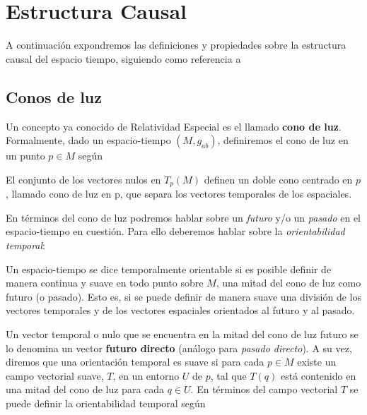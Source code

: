 ﻿\chapter{Estructura Causal}\label{estructura causal}


A continuación expondremos las definiciones y propiedades sobre la estructura causal del espacio tiempo, siguiendo como referencia a \citep{1984ucp..book.....W,1975lsss.book.....H,Penrose}






\section{Conos de luz}

Un concepto ya conocido de Relatividad Especial es el llamado \textbf{cono de luz}. Formalmente, dado un espacio-tiempo $(M,g_{ab})$, definiremos el cono de luz en un punto $p\in M$ según

\begin{definition}
El conjunto de los vectores nulos en $T_p(M)$ definen un doble cono centrado en $p$, llamado cono de luz en p, que separa los vectores temporales de los espaciales.
\end{definition}

En términos del cono de luz podremos hablar sobre un \textit{futuro} y/o un \textit{pasado} en el espacio-tiempo en cuestión. Para ello deberemos hablar sobre la \textit{orientabilidad temporal}:

\begin{definition}
Un espacio-tiempo se dice temporalmente orientable si es posible definir de manera continua y suave en todo punto sobre $M$, una mitad del cono de luz como futuro (o pasado). Esto es, si se puede definir de manera suave una división de los vectores temporales y de los vectores espaciales orientados al futuro y al pasado. 
\end{definition}

Un vector temporal o nulo que se encuentra en la mitad del cono de luz futuro se lo denomina un vector \textbf{futuro directo} (análogo para \textit{pasado directo}). A su vez, diremos que una orientación temporal es suave si para cada $p\in M$ existe un campo vectorial suave, $T$, en un entorno $U$ de $p$, tal que $T(q)$ está contenido en una mitad del cono de luz para cada $q\in U$. En términos del campo vectorial $T$ se puede definir la orientabilidad temporal según


